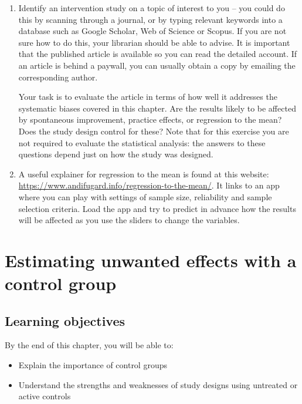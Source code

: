 \documentclass{krantz}
\begin{document}
\begin{enumerate}
\def\labelenumi{\arabic{enumi}.}
\item
  Identify an intervention study on a topic of interest to you -- you could do this by scanning through a journal, or by typing relevant keywords into a database such as Google Scholar, Web of Science or Scopus. If you are not sure how to do this, your librarian should be able to advise. It is important that the published article is available so you can read the detailed account. If an article is behind a paywall, you can usually obtain a copy by emailing the corresponding author.

  Your task is to evaluate the article in terms of how well it addresses the systematic biases covered in this chapter. Are the results likely to be affected by spontaneous improvement, practice effects, or regression to the mean? Does the study design control for these? Note that for this exercise you are not required to evaluate the statistical analysis: the answers to these questions depend just on how the study was designed.
\item
  A useful explainer for regression to the mean is found at this website: \url{https://www.andifugard.info/regression-to-the-mean/}. It links to an app where you can play with settings of sample size, reliability and sample selection criteria. Load the app and try to predict in advance how the results will be affected as you use the sliders to change the variables.
\end{enumerate}

\hypertarget{controls}{%
\chapter{Estimating unwanted effects with a control group}\label{controls}}

\hypertarget{learning-objectives-5}{%
\section{Learning objectives}\label{learning-objectives-5}}

By the end of this chapter, you will be able to:

\begin{itemize}
\item
  Explain the importance of control groups
\item
  Understand the strengths and weaknesses of study designs using untreated or active controls
\end{itemize}
\end{document}
